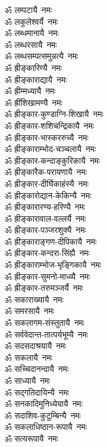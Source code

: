 \begin{multicols}{2}
\begin{flushleft}
ॐ लम्पटायै~नमः\\
ॐ लकुलेश्वर्यै~नमः\\
ॐ लब्धमानायै~नमः\\
ॐ लब्धरसायै~नमः\\
ॐ लब्धसम्पत्समुन्नत्यै~नमः\hfill {}\\
ॐ ह्रीङ्कारिण्यै~नमः\\
ॐ ह्रीङ्काराद्यायै~नमः\\
ॐ ह्रीम्मध्यायै~नमः\\
ॐ ह्रींशिखामण्यै~नमः\\
ॐ ह्रीङ्कार-कुण्डाग्नि-शिखायै~नमः\\
ॐ ह्रीङ्कार-शशिचन्द्रिकायै~नमः\\
ॐ ह्रीङ्कार-भास्कररुच्यै~नमः\\
ॐ ह्रीङ्काराम्भोद-चञ्चलायै~नमः\\
ॐ ह्रीङ्कार-कन्दाङ्कुरिकायै~नमः\\
ॐ ह्रीङ्कारैक-परायणायै~नमः\hfill {}\\
ॐ ह्रीङ्कार-दीर्घिकाहंस्यै~नमः\\
ॐ ह्रीङ्कारोद्यान-केकिन्यै~नमः\\
ॐ ह्रीङ्कारारण्य-हरिण्यै~नमः\\
ॐ ह्रीङ्कारावाल-वल्लर्यै~नमः\\
ॐ ह्रीङ्कार-पञ्जरशुक्यै~नमः\\
ॐ ह्रीङ्काराङ्गण-दीपिकायै~नमः\\
ॐ ह्रीङ्कार-कन्दरा-सिंह्यै~नमः\\
ॐ ह्रीङ्काराम्भोज-भृङ्गिकायै~नमः\\
ॐ ह्रीङ्कार-सुमनो-माध्व्यै~नमः\\
ॐ ह्रीङ्कार-तरुमञ्जर्यै~नमः\hfill {}\\
ॐ सकाराख्यायै~नमः\\
ॐ समरसायै~नमः\\
ॐ सकलागम-संस्तुतायै~नमः\\
ॐ सर्ववेदान्त-तात्पर्यभूम्यै~नमः\\
ॐ सदसदाश्रयायै~नमः\\
ॐ सकलायै~नमः\\
ॐ सच्चिदानन्दायै~नमः\\
ॐ साध्यायै~नमः\\
ॐ सद्गतिदायिन्यै~नमः\\
ॐ सनकादिमुनिध्येयायै~नमः\hfill {}\\
ॐ सदाशिव-कुटुम्बिन्यै~नमः\\
ॐ सकलाधिष्ठान-रूपायै~नमः\\
ॐ सत्यरूपायै~नमः\\

\end{flushleft}
\end{multicols}
